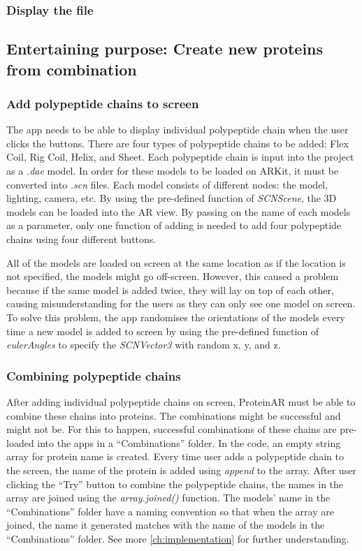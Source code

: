 	\subsubsection{Display the file}
 	
\subsection{Entertaining purpose: Create new proteins from combination}
\subsubsection{Add polypeptide chains to screen}
The app needs to be able to display individual polypeptide chain when the user clicks the buttons. There are four types of polypeptide chains to be added: Flex Coil, Rig Coil, Helix, and Sheet. Each polypeptide chain is input into the project as a \emph{.dae} model. In order for these models to be loaded on ARKit, it must be converted into \emph{.scn} files. Each model consists of different nodes: the model, lighting, camera, etc. By using the pre-defined function of \emph{SCNScene}, the 3D models can be loaded into the AR view. By passing on the name of each models as a parameter, only one function of adding is needed to add four polypeptide chains using four different buttons. 

All of the models are loaded on screen at the same location as if the location is not specified, the models might go off-screen. However, this caused a problem because if the same model is added twice, they will lay on top of each other, causing misunderstanding for the users as they can only see one model on screen. To solve this problem, the app randomises the orientations of the models every time a new model is added to screen by using the pre-defined function of \emph{eulerAngles} to specify the \emph{SCNVector3} with random x, y, and z.

\subsubsection{Combining polypeptide chains}
After adding individual polypeptide chains on screen, ProteinAR must be able to combine these chains into proteins. The combinations might be successful and might not be. For this to happen, successful combinations of these chains are pre-loaded into the apps in a “Combinations” folder. 
In the code, an empty string array for protein name is created. Every time user adds a polypeptide chain to the screen, the name of the protein is added using \emph{append} to the array. After user clicking the “Try” button to combine the polypeptide chains, the names in the array are joined using the \emph{array.joined()} function. The models’ name in the “Combinations” folder have a naming convention so that when the array are joined, the name it generated matches with the name of the models in the “Combinations” folder. See more \autoref{ch:implementation} for further understanding. 

